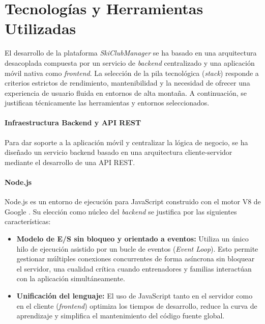 \chapter{Tecnologías y Herramientas Utilizadas}
\label{cap:tecnologias_utilizadas}

El desarrollo de la plataforma \textit{SkiClubManager} se ha basado en una arquitectura desacoplada compuesta por un servicio de \textit{backend} centralizado y una aplicación móvil nativa como \textit{frontend}. La selección de la pila tecnológica (\textit{stack}) responde a criterios estrictos de rendimiento, mantenibilidad y la necesidad de ofrecer una experiencia de usuario fluida en entornos de alta montaña. A continuación, se justifican técnicamente las herramientas y entornos seleccionados.

\subsubsection{Infraestructura Backend y API REST}
Para dar soporte a la aplicación móvil y centralizar la lógica de negocio, se ha diseñado un servicio backend basado en una arquitectura cliente-servidor mediante el desarrollo de una API REST.

\subsubsection{Node.js}
Node.js es un entorno de ejecución para JavaScript construido con el motor V8 de Google \cite{NodeJS}. Su elección como núcleo del \textit{backend} se justifica por las siguientes características:
\begin{itemize}
    \item \textbf{Modelo de E/S sin bloqueo y orientado a eventos:} Utiliza un único hilo de ejecución asistido por un bucle de eventos (\textit{Event Loop}). Esto permite gestionar múltiples conexiones concurrentes de forma asíncrona sin bloquear el servidor, una cualidad crítica cuando entrenadores y familias interactúan con la aplicación simultáneamente.
    \item \textbf{Unificación del lenguaje:} El uso de JavaScript tanto en el servidor como en el cliente (\textit{frontend}) optimiza los tiempos de desarrollo, reduce la curva de aprendizaje y simplifica el mantenimiento del código fuente global.
\end{itemize}

